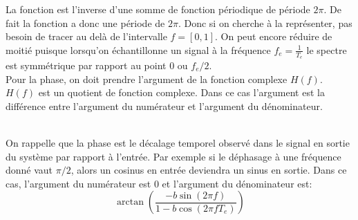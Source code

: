 \documentclass[11pt,a4paper]{article}
\begin{document}
La fonction est l'inverse d'une somme de fonction périodique de période $2\pi$. De fait la fonction a donc une période de $2 \pi$. Donc si on cherche à la représenter, pas besoin de tracer au delà de l'intervalle $f = [0,1]$. On peut encore réduire de moitié puisque lorsqu'on échantillonne un signal à la fréquence $f_e = \frac{1}{T_e}$ le spectre est symmétrique par rapport au point 0 ou $f_e/2$. \\

Pour la phase, on doit prendre l'argument de la fonction complexe $H(f)$. $H(f)$ est un quotient de fonction complexe. Dans ce cas l'argument est la différence entre l'argument du numérateur et l'argument du dénominateur.

\\

On rappelle que la phase est le décalage temporel observé dans le signal en sortie du système par rapport à l'entrée. Par exemple si le déphasage à une fréquence donné vaut $\pi/2$, alors un cosinus en entrée deviendra un sinus en sortie. Dans ce cas, l'argument du numérateur est 0 et l'argument du dénominateur est: \\

\[ \arctan(\frac{-b \sin(2 \pi f)}{1-b \cos(2 \pi fT_e)})\]\\
\end{document}
